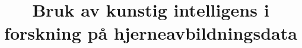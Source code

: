 \documentclass[aspectratio=169]{beamer}
\title{Bruk av kunstig intelligens i forskning på hjerneavbildningsdata}
\begin{document}
	\begin{frame}
	 	\titlepage
	\end{frame}

    
    
\end{document}
